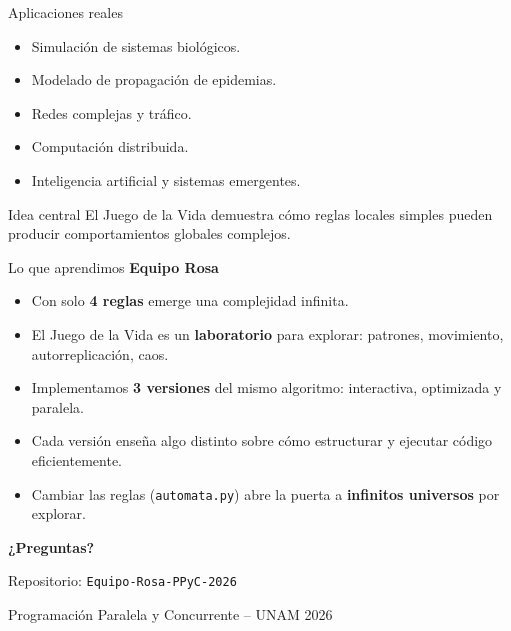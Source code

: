 \documentclass[10pt,aspectratio=169]{beamer}
\begin{document}
\begin{frame}{Aplicaciones reales}

\begin{itemize}
    \item Simulación de sistemas biológicos.
    \item Modelado de propagación de epidemias.
    \item Redes complejas y tráfico.
    \item Computación distribuida.
    \item Inteligencia artificial y sistemas emergentes.
\end{itemize}

\vspace{0.5cm}

\begin{alertblock}{Idea central}
El Juego de la Vida demuestra cómo reglas locales simples
pueden producir comportamientos globales complejos.
\end{alertblock}

\end{frame}
\begin{frame}{Lo que aprendimos}
  \textbf{Equipo Rosa}

  \vspace{0.4cm}

  \begin{itemize}
    \item Con solo \textbf{4 reglas} emerge una complejidad infinita.
    \item El Juego de la Vida es un \textbf{laboratorio} para explorar:
          patrones, movimiento, autorreplicación, caos.
    \item Implementamos \textbf{3 versiones} del mismo algoritmo:
          interactiva, optimizada y paralela.
    \item Cada versión enseña algo distinto sobre cómo estructurar
          y ejecutar código eficientemente.
    \item Cambiar las reglas (\texttt{automata.py}) abre la puerta
          a \textbf{infinitos universos} por explorar.
  \end{itemize}

  \vspace{0.5cm}

  \begin{center}
    \Large \textbf{¿Preguntas?}

    \vspace{0.3cm}
    \normalsize
    Repositorio: \texttt{Equipo-Rosa-PPyC-2026}

    Programación Paralela y Concurrente -- UNAM 2026
  \end{center}
\end{frame}
\end{document}

